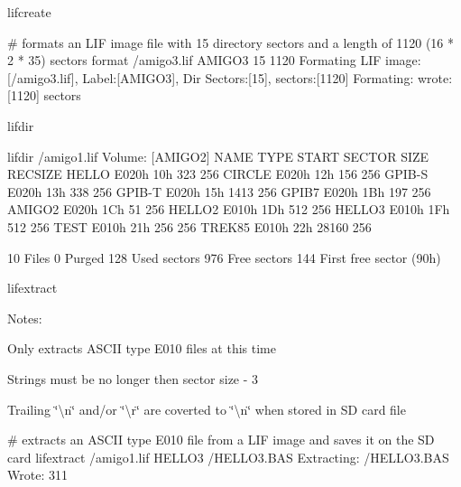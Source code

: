 lifcreate 
\begin{DoxyPre}
         \# formats an LIF image file with 15 directory sectors and a length of 1120 (16 * 2 * 35) sectors
         format /amigo3.lif AMIGO3 15 1120
         Formating LIF image:[/amigo3.lif], Label:[AMIGO3], Dir Sectors:[15], sectors:[1120]
         Formating: wrote:[1120] sectors
      \end{DoxyPre}



\begin{DoxyItemize}
\item lifdir 
\begin{DoxyPre}
        lifdir /amigo1.lif
        Volume: [AMIGO2]
        NAME         TYPE   START SECTOR        SIZE    RECSIZE
        HELLO       E020h            10h         323        256
        CIRCLE      E020h            12h         156        256
        GPIB-S      E020h            13h         338        256
        GPIB-T      E020h            15h        1413        256
        GPIB7       E020h            1Bh         197        256
        AMIGO2      E020h            1Ch          51        256
        HELLO2      E010h            1Dh         512        256
        HELLO3      E010h            1Fh         512        256
        TEST        E010h            21h         256        256
        TREK85      E010h            22h       28160        256\end{DoxyPre}



\begin{DoxyPre}              10 Files
               0 Purged
             128 Used sectors
             976 Free sectors
             144 First free sector (90h)
      \end{DoxyPre}

\item lifextract
\begin{DoxyItemize}
\item Notes\+:
\begin{DoxyItemize}
\item Only extracts A\+S\+C\+II type E010 files at this time
\item Strings must be no longer then sector size -\/ 3
\item Trailing \char`\"{}\textbackslash{}n\char`\"{} and/or \char`\"{}\textbackslash{}r\char`\"{} are coverted to \char`\"{}\textbackslash{}n\char`\"{} when stored in SD card file 
\begin{DoxyPre}
         \# extracts an ASCII type E010 file from a LIF image and saves it on the SD card
         lifextract /amigo1.lif HELLO3 /HELLO3.BAS
         Extracting: /HELLO3.BAS
         Wrote:      311
      \end{DoxyPre}
 


\end{DoxyItemize}
\end{DoxyItemize}
\end{DoxyItemize}

